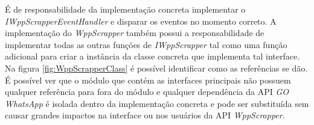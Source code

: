




É de responsabilidade da implementação concreta implementar o \textit{IWppScrapperEventHandler} e disparar os eventos no momento correto. A implementação do \textit{WppScrapper} também possui a responsabilidade de implementar todas as outras funções de \textit{IWppScrapper} tal como uma função adicional para criar a instância da classe concreta que implementa tal interface. Na figura \ref{fig:WppScrapperClass} é possível identificar como as referências se dão. É possível ver que o módulo que contém as interfaces principais não possuem qualquer referência para fora do módulo e qualquer dependência da API \textit{GO WhatsApp} é isolada dentro da implementação concreta e pode ser substituída sem causar grandes impactos na interface ou nos usuários da API \textit{WppScrapper}.

